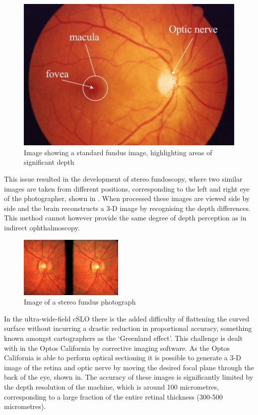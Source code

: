 \begin{figure}[htbp]
\centering
\includegraphics{figures/normalfundus}
\caption{Image showing a  standard fundus image, highlighting areas of significant depth}
\label{fig:standard}
   \end{figure}

This issue resulted in the development of stereo fundoscopy, where
two similar images are taken from different positions, corresponding
to the left and right eye of the photographer, shown in .
When processed these images are viewed side by side and the brain
reconstructs a 3-D image by recognising the depth differences.\cite{tyler1997stereo}
This method cannot however provide the same degree of depth perception
as in indirect ophthalmoscopy.

\begin{figure}[htbp]
\centering
\includegraphics{figures/stereo}
\caption{Image of a stereo fundus photograph}
\label{fig:stereo}
   \end{figure}

In the ultra-wide-field cSLO there is the added difficulty of flattening
the curved surface without incurring a drastic reduction in proportional
accuracy, something known amongst cartographers as the ‘Greenland effect’.
This challenge is dealt with in the Optos California by corrective imaging
software. As the Optos California is able to perform optical sectioning it
is possible to generate a 3-D image of the retina and optic nerve by moving
the desired focal plane through the back of the eye, shown in.
The accuracy of these images is significantly limited by the depth resolution
of the machine, which is around 100 micrometres, corresponding to  a large
fraction of the entire retinal thickness (300-500 micrometres).

